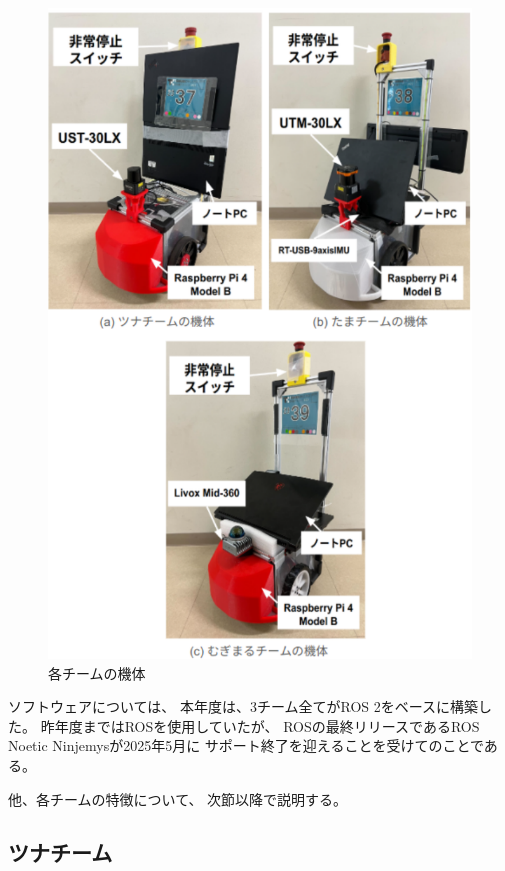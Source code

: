 \documentclass[twocolumn,9pt]{jsproceedings}
\begin{document}
\begin{figure}[h]
  \begin{center}
    \includegraphics[width=1.0\linewidth]{figs/robot.pdf}
    \caption{各チームの機体}
    \label{fig:robot}
  \end{center}
\end{figure}

ソフトウェアについては、
本年度は、3チーム全てがROS 2\cite{ROS 2}をベースに構築した。
昨年度まではROS\cite{ROS}を使用していたが、
ROSの最終リリースであるROS Noetic Ninjemysが2025年5月に
サポート終了を迎えることを受けてのことである。

他、各チームの特徴について、
次節以降で説明する。


\subsection{ツナチーム}
\end{document}
